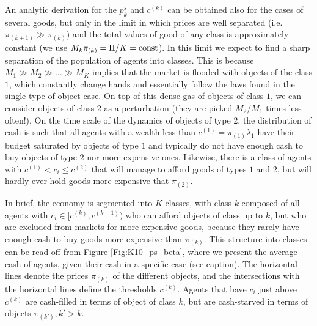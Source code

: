 An analytic derivation for the $p_k^s$ and $c^{(k)}$ can be obtained also for the cases of several goods, but only in the limit in which prices are well separated (i.e. $\pi_{(k+1)} \gg \pi_{(k)}$) and the total values of good of any class is approximately constant (we use $M_k\pi_{(k)}  = \Pi / K = {\rm const}$). 
In this limit we expect to find a sharp separation of the population of agents into classes. 
This is because $M_1\gg M_2\gg \ldots \gg M_K$ implies that the market is flooded with objects of the class $1$, which constantly change hands and essentially follow the laws found in the single type of object case. 
On top of this dense gas of objects of class $1$, we can consider objects of class $2$ as a perturbation (they are picked $M_2/M_1$ times less often!).
On the time scale of the dynamics of objects of type $2$, the distribution of cash is such that all agents with a wealth less than $c^{(1)}=\pi_{(1)}\lambda_1$ have their budget saturated by objects of type $1$ and typically do not have enough cash to buy objects of type $2$ nor more expensive ones. 
Likewise, there is a class of agents with $c^{(1)}<c_i\le c^{(2)}$ that will manage to afford goods of types $1$ and $2$, but will hardly ever hold goods more expensive that $\pi_{(2)}$. 

In brief, the economy is segmented into $K$ classes, with class $k$ composed of all agents with  $c_i\in [c^{(k)},c^{(k+1)})$ who can afford objects of class up to $k$, but who are excluded from markets for more expensive goods, because they rarely have enough cash to buy goods more expensive than $\pi_{(k)}$. This structure into classes can be read off from Figure \ref{Fig:K10_ps_beta}, where we present the average cash of agents, given their cash in a specific case (see caption). The horizontal lines denote the prices $\pi_{(k)}$ of the different objects, and the intersections with the horizontal lines define the thresholds $c^{(k)}$. Agents that have $c_i$ just above $c^{(k)}$ are cash-filled in terms of object of class $k$, but are cash-starved in terms of objects $\pi_{(k')}, k'>k$. 

